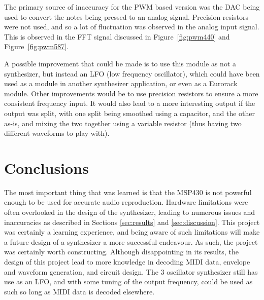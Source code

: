 \documentclass[12pt]{article}
\begin{document}
The primary source of inaccuracy for the PWM based version was the DAC being used to convert the notes being pressed to an analog signal.
Precision resistors were not used, and so a lot of fluctuation was observed in the analog input signal.
This is observed in the FFT signal discussed in Figure~\ref{fig:pwm440} and Figure~\ref{fig:pwm587}. 

A possible improvement that could be made is to use this module as not a synthesizer, but instead an LFO (low frequency oscillator), which could have been used as a module in another synthesizer application, or even as a Eurorack module. Other improvements would be to use precision resistors to ensure a more consistent frequency input. It would also lead to a more interesting output if the output was split, with one split being smoothed using a capacitor, and the other as-is, and mixing the two together using a variable resistor (thus having two different waveforms to play with). 

\section{Conclusions}\label{sec:conclusions}


The most important thing that was learned is that the MSP430 is not powerful enough to be used for accurate audio reproduction. Hardware limitations were often overlooked in the design of the synthesizer, leading to numerous issues and inaccuracies as described in Sections \ref{sec:results} and \ref{sec:discussion}. This project was certainly a learning experience, and being aware of such limitations will make a future design of a synthesizer a more successful endeavour. As such, the project was certainly worth constructing. Although disappointing in its results, the design of this project lead to more knowledge in decoding MIDI data, envelope and waveform generation, and circuit design. The 3 oscillator synthesizer still has use as an LFO, and with some tuning of the output frequency, could be used as such so long as MIDI data is decoded elsewhere. 

\end{document}
